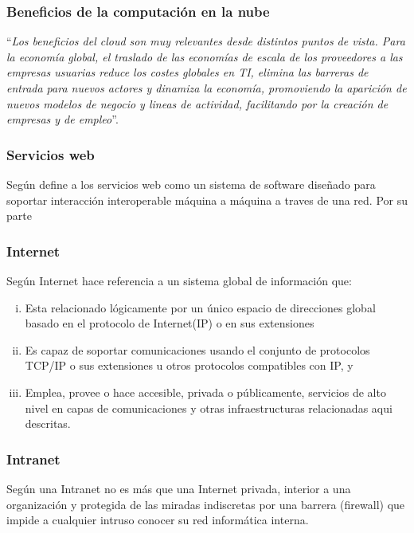 \subsubsection{Beneficios de la computaci\'on en la nube}
``\emph{Los beneficios del cloud son muy relevantes desde distintos puntos de vista.
Para la econom\'ia global, el traslado de las econom\'ias de escala de los
proveedores a las empresas usuarias reduce los costes globales en TI, elimina
las barreras de entrada para nuevos actores y dinamiza la econom\'ia, promoviendo
la aparici\'on de nuevos modelos de negocio y lineas de actividad, facilitando
por la creaci\'on de empresas y de empleo}''\citep{cierco}.

\subsubsection{Servicios web}

Seg\'un \cite{w3c} define a los servicios web como un sistema de software dise\~nado
para soportar interacci\'on interoperable m\'aquina a m\'aquina a traves de una red.
Por su parte
\subsubsection{Internet}
Seg\'un \cite{fnc} Internet hace referencia a un sistema global de informaci\'on que:
\begin{enumerate}[i.]
    \item Esta relacionado l\'ogicamente por un \'unico espacio de direcciones
          global basado en el protocolo de Internet(IP) o en sus extensiones
    \item Es capaz de soportar comunicaciones usando el conjunto de protocolos TCP/IP
          o sus extensiones u otros protocolos compatibles con IP, y
    \item Emplea, provee o hace accesible, privada o p\'ublicamente, servicios de
          alto nivel en capas de comunicaciones y otras infraestructuras relacionadas
          aqui descritas.
\end{enumerate}
\subsubsection{Intranet}
Seg\'un \cite{lafrance} una Intranet no es m\'as que una Internet privada, interior a una
organizaci\'on y protegida de las miradas indiscretas por una barrera (firewall) que
impide a cualquier intruso conocer su red inform\'atica interna.
